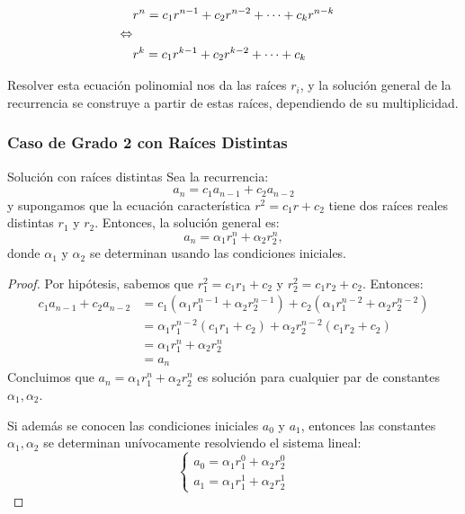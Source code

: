 \begin{align*}
 &  r^n = c_1 r^{n-1} + c_2 r^{n-2} + \cdots + c_k r^{n-k} \\
& \hspace{-3ex} \Leftrightarrow\\
&  r^k = c_1 r^{k-1} + c_2 r^{k-2} + \cdots + c_k
\end{align*}

Resolver esta ecuación polinomial nos da las raíces $r_i$, y la solución general de la recurrencia se construye a partir de estas raíces, dependiendo de su multiplicidad.

\subsubsection{Caso de Grado 2 con Raíces Distintas}

\begin{thmblock}{Solución con raíces distintas}
Sea la recurrencia:
\[
a_n = c_1 a_{n-1} + c_2 a_{n-2}
\]
y supongamos que la ecuación característica $r^2 = c_1 r + c_2$ tiene dos raíces reales distintas $r_1$ y $r_2$. Entonces, la solución general es:
\[
a_n = \alpha_1 r_1^n + \alpha_2 r_2^n,
\]
donde $\alpha_1$ y $\alpha_2$ se determinan usando las condiciones iniciales.
\end{thmblock}
\begin{proof}
Por hipótesis, sabemos que $r_1^2 = c_1 r_1 + c_2$ y $r_2^2 = c_1 r_2 + c_2$. Entonces:
\begin{align*}
c_1 a_{n-1} + c_2 a_{n-2} &= c_1(\alpha_1 r_1^{n-1} + \alpha_2 r_2^{n-1}) + c_2(\alpha_1 r_1^{n-2} + \alpha_2 r_2^{n-2}) \\
&= \alpha_1 r_1^{n-2}(c_1 r_1 + c_2) + \alpha_2 r_2^{n-2}(c_1 r_2 + c_2) \\
&= \alpha_1 r_1^n + \alpha_2 r_2^n \\
&= a_n
\end{align*}
Concluimos que $a_n = \alpha_1 r_1^n + \alpha_2 r_2^n$ es solución para cualquier par de constantes $\alpha_1, \alpha_2$.

Si además se conocen las condiciones iniciales $a_0$ y $a_1$, entonces las constantes $\alpha_1, \alpha_2$ se determinan unívocamente resolviendo el sistema lineal:
\[
\begin{cases}
a_0 = \alpha_1 r_1^0 + \alpha_2 r_2^0 \\
a_1 = \alpha_1 r_1^1 + \alpha_2 r_2^1
\end{cases}
\]
\end{proof}

